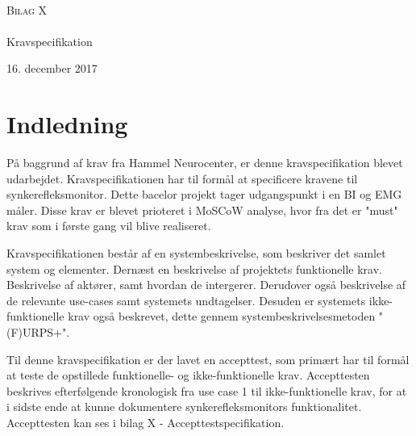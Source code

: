 \documentclass[main.tex]{subfiles}
\begin{document}
\begin{titlingpage}
\begin{center}

~ \\[3cm]


\textsc{\LARGE Bilag X}\\[1.5cm]


\noindent\makebox[\linewidth]{\rule{\textwidth}{0.4pt}}\\
[0.5cm]{\Huge Kravspecifikation}
\noindent\makebox[\linewidth]{\rule{\textwidth}{0.4pt}}
\end{center}
\vfill
\begin{center}
{\large 16. december 2017}
\end{center}
\end{titlingpage}

\newpage
\tableofcontents*


\chapter{Indledning}
På baggrund af krav fra Hammel Neurocenter, er denne
kravspecifikation blevet udarbejdet. Kravspecifikationen har til formål at specificere
kravene til synkerefleksmonitor. Dette bacelor projekt tager udgangspunkt i en BI og EMG måler. Disse krav er blevet prioteret i MoSCoW analyse, hvor fra det er "must" krav som i første gang vil blive realiseret. 

Kravspecifikationen består af en systembeskrivelse, som beskriver det samlet system og elementer. Dernæst en beskrivelse af projektets funktionelle krav. Beskrivelse af
aktører, samt hvordan de intergerer. Derudover også beskrivelse af de relevante use-cases
samt systemets undtagelser. Desuden er systemets ikke-funktionelle krav også beskrevet,
dette gennem systembeskrivelsesmetoden "(F)URPS+".

Til denne kravspecifikation er der lavet en accepttest, som primært har til formål at teste
de opstillede funktionelle- og ikke-funktionelle krav. Accepttesten beskrives efterfølgende
kronologisk fra use case 1 til ikke-funktionelle krav, for at i sidste ende at kunne
dokumentere synkerefleksmonitors funktionalitet. Accepttesten kan ses i bilag X - Accepttestspecifikation.
\end{document}
